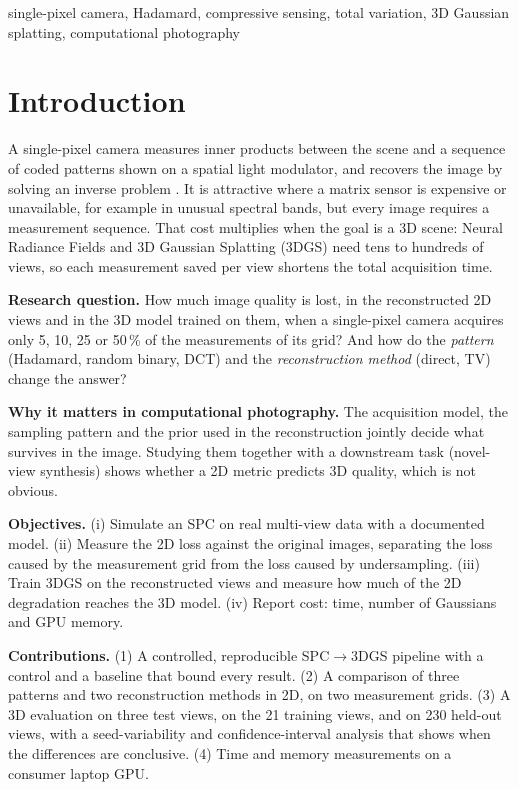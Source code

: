 \documentclass[conference]{IEEEtran}
\begin{document}
\begin{IEEEkeywords}
single-pixel camera, Hadamard, compressive sensing, total variation, 3D Gaussian splatting, computational photography
\end{IEEEkeywords}

\section{Introduction}
A single-pixel camera measures inner products between the scene and a sequence of coded patterns shown on a spatial
light modulator, and recovers the image by solving an inverse problem \cite{duarte2008,edgar2019}. It is attractive
where a matrix sensor is expensive or unavailable, for example in unusual spectral bands, but every image requires a
measurement sequence. That cost multiplies when the goal is a 3D scene: Neural Radiance Fields \cite{mildenhall2020} and
3D Gaussian Splatting (3DGS) \cite{kerbl2023} need tens to hundreds of views, so each measurement saved per view
shortens the total acquisition time.

\textbf{Research question.} How much image quality is lost, in the reconstructed 2D views and in the 3D model trained on
them, when a single-pixel camera acquires only 5, 10, 25 or 50\,\% of the measurements of its grid? And how do the
\emph{pattern} (Hadamard, random binary, DCT) and the \emph{reconstruction method} (direct, TV) change the answer?

\textbf{Why it matters in computational photography.} The acquisition model, the sampling pattern and the prior used in
the reconstruction jointly decide what survives in the image. Studying them together with a downstream task (novel-view
synthesis) shows whether a 2D metric predicts 3D quality, which is not obvious.

\textbf{Objectives.} (i) Simulate an SPC on real multi-view data with a documented model. (ii) Measure the 2D loss against
the original images, separating the loss caused by the measurement grid from the loss caused by undersampling.
(iii) Train 3DGS on the reconstructed views and measure how much of the 2D degradation reaches the 3D model.
(iv) Report cost: time, number of Gaussians and GPU memory.

\textbf{Contributions.} (1) A controlled, reproducible SPC$\rightarrow$3DGS pipeline with a control and a baseline that
bound every result. (2) A comparison of three patterns and two reconstruction methods in 2D, on two measurement grids.
(3) A 3D evaluation on three test views, on the 21 training views, and on 230 held-out views, with a seed-variability
and confidence-interval analysis that shows when the differences are conclusive. (4) Time and memory measurements on a
consumer laptop GPU.
\end{document}
